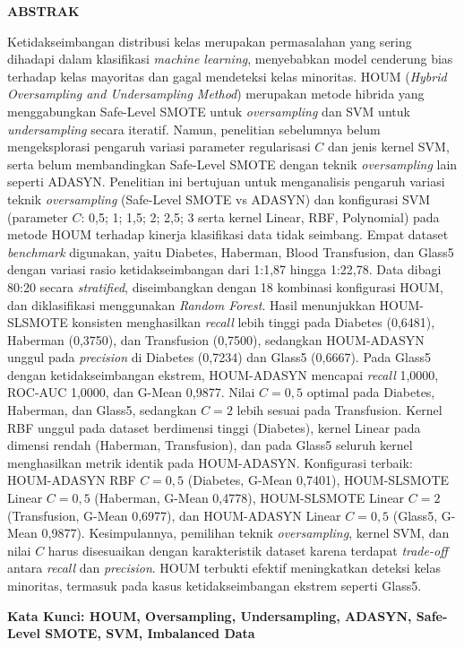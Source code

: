 \clearpage
{}%
\thispagestyle{fancy}

\begin{center}
	\large \bfseries \MakeUppercase{Abstrak}\\
	\bigskip
	
	\normalsize \normalfont \justifying \singlespacing
	Ketidakseimbangan distribusi kelas merupakan permasalahan yang sering dihadapi dalam klasifikasi \textit{machine learning}, menyebabkan model cenderung bias terhadap kelas mayoritas dan gagal mendeteksi kelas minoritas. HOUM (\textit{Hybrid Oversampling and Undersampling Method}) merupakan metode hibrida yang menggabungkan Safe-Level SMOTE untuk \textit{oversampling} dan SVM untuk \textit{undersampling} secara iteratif. Namun, penelitian sebelumnya belum mengeksplorasi pengaruh variasi parameter regularisasi $C$ dan jenis kernel SVM, serta belum membandingkan Safe-Level SMOTE dengan teknik \textit{oversampling} lain seperti ADASYN. Penelitian ini bertujuan untuk menganalisis pengaruh variasi teknik \textit{oversampling} (Safe-Level SMOTE vs ADASYN) dan konfigurasi SVM (parameter $C$: 0,5; 1; 1,5; 2; 2,5; 3 serta kernel Linear, RBF, Polynomial) pada metode HOUM terhadap kinerja klasifikasi data tidak seimbang. Empat dataset \textit{benchmark} digunakan, yaitu Diabetes, Haberman, Blood Transfusion, dan Glass5 dengan variasi rasio ketidakseimbangan dari 1:1,87 hingga 1:22,78. Data dibagi 80:20 secara \textit{stratified}, diseimbangkan dengan 18 kombinasi konfigurasi HOUM, dan diklasifikasi menggunakan \textit{Random Forest}. Hasil menunjukkan HOUM-SLSMOTE konsisten menghasilkan \textit{recall} lebih tinggi pada Diabetes (0,6481), Haberman (0,3750), dan Transfusion (0,7500), sedangkan HOUM-ADASYN unggul pada \textit{precision} di Diabetes (0,7234) dan Glass5 (0,6667). Pada Glass5 dengan ketidakseimbangan ekstrem, HOUM-ADASYN mencapai \textit{recall} 1,0000, ROC-AUC 1,0000, dan G-Mean 0,9877. Nilai $C=0,5$ optimal pada Diabetes, Haberman, dan Glass5, sedangkan $C=2$ lebih sesuai pada Transfusion. Kernel RBF unggul pada dataset berdimensi tinggi (Diabetes), kernel Linear pada dimensi rendah (Haberman, Transfusion), dan pada Glass5 seluruh kernel menghasilkan metrik identik pada HOUM-ADASYN. Konfigurasi terbaik: HOUM-ADASYN RBF $C=0,5$ (Diabetes, G-Mean 0,7401), HOUM-SLSMOTE Linear $C=0,5$ (Haberman, G-Mean 0,4778), HOUM-SLSMOTE Linear $C=2$ (Transfusion, G-Mean 0,6977), dan HOUM-ADASYN Linear $C=0,5$ (Glass5, G-Mean 0,9877). Kesimpulannya, pemilihan teknik \textit{oversampling}, kernel SVM, dan nilai $C$ harus disesuaikan dengan karakteristik dataset karena terdapat \textit{trade-off} antara \textit{recall} dan \textit{precision}. HOUM terbukti efektif meningkatkan deteksi kelas minoritas, termasuk pada kasus ketidakseimbangan ekstrem seperti Glass5.

    \vspace{20pt}
	\raggedright \textbf{Kata Kunci: HOUM, Oversampling, Undersampling, ADASYN, Safe-Level SMOTE, SVM, Imbalanced Data}
	
	\vfill
	
\end{center}
\clearpage